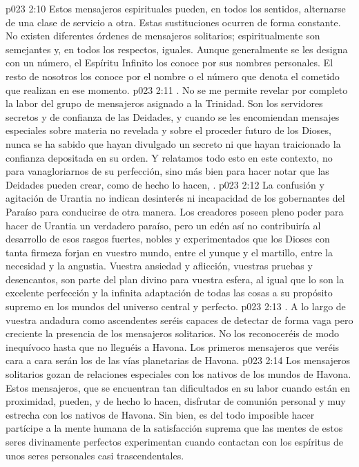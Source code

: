 \vs p023 2:10 \pc Estos mensajeros espirituales pueden, en todos los sentidos, alternarse de una clase de servicio a otra. Estas sustituciones ocurren de forma constante. No existen diferentes órdenes de mensajeros solitarios; espiritualmente son semejantes y, en todos los respectos, iguales. Aunque generalmente se les designa con un número, el Espíritu Infinito los conoce por sus nombres personales. El resto de nosotros los conoce por el nombre o el número que denota el cometido que realizan en ese momento.
\vs p023 2:11 . No se me permite revelar por completo la labor del grupo de mensajeros asignado a la Trinidad. Son los servidores secretos y de confianza de las Deidades, y cuando se les encomiendan mensajes especiales sobre materia no revelada y sobre el proceder futuro de los Dioses, nunca se ha sabido que hayan divulgado un secreto ni que hayan traicionado la confianza depositada en su orden. Y relatamos todo esto en este contexto, no para vanagloriarnos de su perfección, sino más bien para hacer notar que las Deidades pueden crear, como de hecho lo hacen, .
\vs p023 2:12 La confusión y agitación de Urantia no indican desinterés ni incapacidad de los gobernantes del Paraíso para conducirse de otra manera. Los creadores poseen pleno poder para hacer de Urantia un verdadero paraíso, pero un edén así no contribuiría al desarrollo de esos rasgos fuertes, nobles y experimentados que los Dioses con tanta firmeza forjan en vuestro mundo, entre el yunque y el martillo, entre la necesidad y la angustia. Vuestra ansiedad y aflicción, vuestras pruebas y desencantos, son parte del plan divino para vuestra esfera, al igual que lo son la excelente perfección y la infinita adaptación de todas las cosas a su propósito supremo en los mundos del universo central y perfecto.
\vs p023 2:13 . A lo largo de vuestra andadura como ascendentes seréis capaces de detectar de forma vaga pero creciente la presencia de los mensajeros solitarios. No los reconoceréis de modo inequívoco hasta que no lleguéis a Havona. Los primeros mensajeros que veréis cara a cara serán los de las vías planetarias de Havona.
\vs p023 2:14 Los mensajeros solitarios gozan de relaciones especiales con los nativos de los mundos de Havona. Estos mensajeros, que se encuentran tan dificultados en su labor cuando están en proximidad, pueden, y de hecho lo hacen, disfrutar de comunión personal y muy estrecha con los nativos de Havona. Sin bien, es del todo imposible hacer partícipe a la mente humana de la satisfacción suprema que las mentes de estos seres divinamente perfectos experimentan cuando contactan con los espíritus de unos seres personales casi trascendentales.
